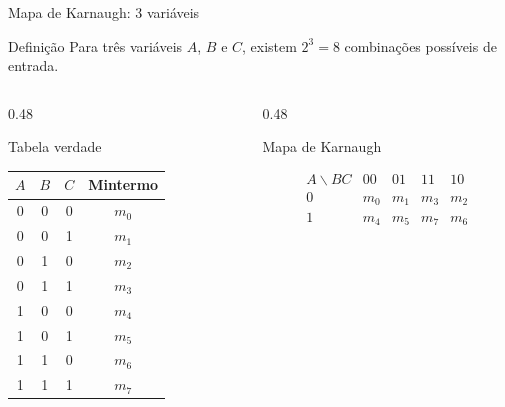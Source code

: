 \begin{frame}{Mapa de Karnaugh: 3 variáveis}
    \small

    \begin{block}{Definição}
        Para três variáveis $A$, $B$ e $C$, existem $2^3 = 8$ combinações possíveis de entrada.
    \end{block}

    \begin{columns}[T]

        \begin{column}{0.48\textwidth}
            \begin{block}{Tabela verdade}
                \centering

                \begin{tabular}{c c c | c}
                    $A$ & $B$ & $C$ & Mintermo \\ \hline
                    0 & 0 & 0 & $m_0$ \\
                    0 & 0 & 1 & $m_1$ \\
                    0 & 1 & 0 & $m_2$ \\
                    0 & 1 & 1 & $m_3$ \\
                    1 & 0 & 0 & $m_4$ \\
                    1 & 0 & 1 & $m_5$ \\
                    1 & 1 & 0 & $m_6$ \\
                    1 & 1 & 1 & $m_7$
                \end{tabular}
            \end{block}
        \end{column}

        \begin{column}{0.48\textwidth}
            \begin{block}{Mapa de Karnaugh}

                \[
                \begin{array}{c|cccc}
                    A\backslash BC & 00 & 01 & 11 & 10 \\ \hline
                    0 & m_0 & m_1 & m_3 & m_2 \\
                    1 & m_4 & m_5 & m_7 & m_6
                \end{array}
                \]

            \end{block}
        \end{column}

    \end{columns}

\end{frame}